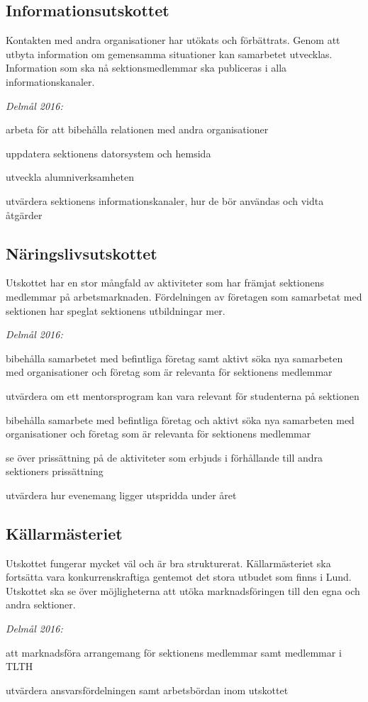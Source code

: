 \documentclass[../_main/handlingar.tex]{subfiles}
\begin{document}
\subsection*{Informationsutskottet}
Kontakten med andra organisationer har utökats och förbättrats. Genom att utbyta information om gemensamma situationer kan samarbetet utvecklas. Information som ska nå sektionsmedlemmar ska publiceras i alla informationskanaler.

\emph{Delmål 2016:}
\begin{dashlist}
    \item arbeta för att bibehålla relationen med andra organisationer
    \item uppdatera sektionens datorsystem och hemsida
    \item utveckla alumniverksamheten
    \item utvärdera sektionens informationskanaler, hur de bör användas och vidta åtgärder
\end{dashlist}

\subsection*{Näringslivsutskottet}
Utskottet har en stor mångfald av aktiviteter som har främjat sektionens medlemmar på arbetsmarknaden. Fördelningen av företagen som samarbetat med sektionen har speglat sektionens utbildningar mer.

\emph{Delmål 2016:}
\begin{dashlist}
    \item bibehålla samarbetet med befintliga företag samt aktivt söka nya samarbeten med organisationer och företag som är relevanta för sektionens medlemmar
    \item utvärdera om ett mentorsprogram kan vara relevant för studenterna på sektionen
    \item bibehålla samarbete med befintliga företag och aktivt söka nya samarbeten med organisationer och företag som är relevanta för sektionens medlemmar
    \item se över prissättning på de aktiviteter som erbjuds i förhållande till andra sektioners prissättning
    \item utvärdera hur evenemang ligger utspridda under året
\end{dashlist}

\subsection*{Källarmästeriet}
Utskottet fungerar mycket väl och är bra strukturerat. Källarmästeriet ska fortsätta vara konkurrenskraftiga gentemot det stora utbudet som finns i Lund. Utskottet ska se över möjligheterna att utöka marknadsföringen till den egna och andra sektioner.

\emph{Delmål 2016:}
\begin{dashlist}
    \item att marknadsföra arrangemang för sektionens medlemmar samt medlemmar i TLTH
    \item utvärdera ansvarsfördelningen samt arbetsbördan inom utskottet
\end{dashlist}

\newpage
\end{document}
